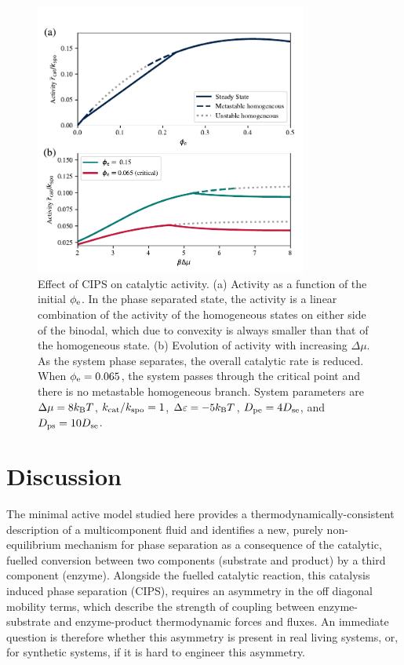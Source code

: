 \begin{figure}
    \centering
    \includegraphics[width=0.8\textwidth]{figures/CIPSautoregulation.pdf}
    \caption{Effect of CIPS on catalytic activity. (a) Activity as a function of the initial $\phi_{\mathrm{e}}$. In the phase separated state, the activity is a linear combination of the activity of the homogeneous states on either side of the binodal, which due to convexity is always smaller than that of the homogeneous state. (b) Evolution of activity with increasing $\Delta \mu$. As the system phase separates, the overall catalytic rate is reduced. When $\phi_{\mathrm{e}}=0.065$, the system passes through the critical point and there is no metastable homogeneous branch. System parameters are $\Delta\mu=8 k_{\rm B} T$, $k_{\mathrm{cat}}/k_{\mathrm{spo}}=1$, $\Delta \varepsilon=-5 k_{\rm B} T$, $D_{\mathrm{pe}}=4 D_{\mathrm{se}}$, and $D_{\mathrm{ps}}=10 D_{\mathrm{se}}$.}
    \label{fig:CIPSautoregulation}
\end{figure}

\section{Discussion}

The minimal active model studied here provides a thermodynamically-consistent description of a multicomponent fluid and identifies a new, purely non-equilibrium mechanism for phase separation as a consequence of the catalytic, fuelled conversion between two components (substrate and product) by a third component (enzyme). Alongside the fuelled catalytic reaction, this catalysis induced phase separation (CIPS), requires an asymmetry in the off diagonal mobility terms, which describe the strength of coupling between enzyme-substrate and enzyme-product thermodynamic forces and fluxes. An immediate question is therefore whether this asymmetry is present in real living systems, or, for synthetic systems, if it is hard to engineer this asymmetry.

